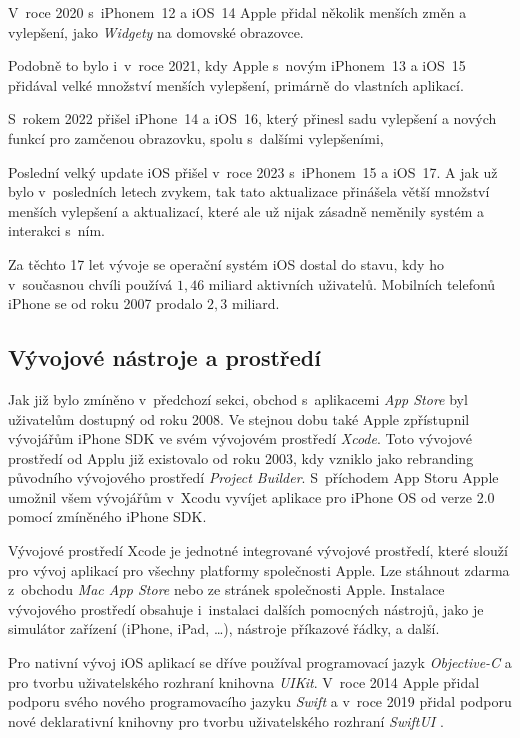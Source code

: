V~roce 2020 s~iPhonem~12 a iOS~14 Apple přidal několik menších změn a vylepšení, jako \emph{Widgety} na domovské obrazovce.

Podobně to bylo i~v~roce 2021, kdy Apple s~novým iPhonem~13 a iOS~15 přidával velké množství menších vylepšení, primárně do vlastních aplikací.

S~rokem 2022 přišel iPhone~14 a iOS~16, který přinesl sadu vylepšení a nových funkcí pro zamčenou obrazovku, spolu s~dalšími vylepšeními,

Poslední velký update iOS přišel v~roce 2023 s~iPhonem~15 a iOS~17. A jak už bylo v~posledních letech zvykem, tak tato aktualizace přinášela větší množství menších vylepšení a aktualizací, které ale už nijak zásadně neměnily systém a interakci s~ním. \cite{history-of-ios}

Za těchto 17 let vývoje se operační systém iOS dostal do stavu, kdy ho v~současnou chvíli používá $1,46$ miliard aktivních uživatelů. Mobilních telefonů iPhone se od roku 2007 prodalo $2,3$ miliard. \cite{iphone-user-statistics}

\subsection{Vývojové nástroje a prostředí}

Jak již bylo zmíněno v~předchozí sekci, obchod s~aplikacemi \emph{App Store} byl uživatelům dostupný od roku 2008. Ve stejnou dobu také Apple zpřístupnil vývojářům iPhone SDK ve svém vývojovém prostředí \emph{Xcode}. Toto vývojové prostředí od Applu již existovalo od roku 2003, kdy vzniklo jako rebranding původního vývojového prostředí \emph{Project Builder}. S~příchodem App Storu Apple umožnil všem vývojářům v~Xcodu vyvíjet aplikace pro iPhone OS od verze 2.0 pomocí zmíněného iPhone SDK. 

Vývojové prostředí Xcode je jednotné integrované vývojové prostředí, které slouží pro vývoj aplikací pro všechny platformy společnosti Apple. Lze stáhnout zdarma z~obchodu \emph{Mac App Store} nebo ze stránek společnosti Apple. Instalace vývojového prostředí obsahuje i~instalaci dalších pomocných nástrojů, jako je simulátor zařízení (iPhone, iPad, \dots), nástroje příkazové řádky, a další. \cite{xcode-history}

Pro nativní vývoj iOS aplikací se dříve používal programovací jazyk \emph{Objective-C} \cite{objc} a pro tvorbu uživatelského rozhraní knihovna \emph{UIKit}. V~roce 2014 Apple přidal podporu svého nového programovacího jazyku \emph{Swift} \cite{swift} a v~roce 2019 přidal podporu nové deklarativní knihovny pro tvorbu uživatelského rozhraní \emph{SwiftUI} \cite{swiftui}.

